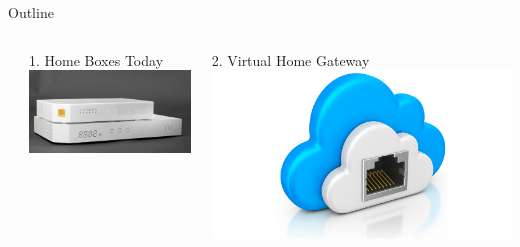 \documentclass[a4paper]{beamer}
\begin{document}
\begin{frame}{Outline}
																	
																	
																
	\begin{columns}[c] %
		\begin{block}{}
		\end{block}
		\begin{block}{1. Home Boxes Today}
			\includegraphics[width= \textwidth]{homebox.jpg}
		\end{block}
		\column{.25\textwidth}
		\begin{block}{2. Virtual Home Gateway }
			\includegraphics[width= \textwidth]{vhg.png}
		\end{block}
																																          

\end{columns}
\end{frame}
\end{document}
